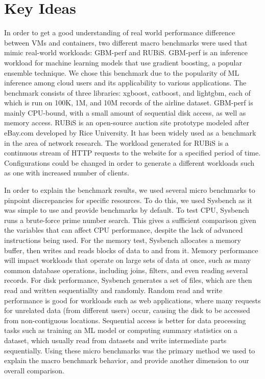 \documentclass[11pt]{article}
\begin{document}
\section{Key Ideas}

In order to get a good understanding of real world performance difference between VMs and containers, two different macro benchmarks were used that mimic real-world workloads: GBM-perf and RUBiS. GBM-perf is an inference workload for machine learning models that use gradient boosting, a popular ensemble technique. We chose this benchmark due to the popularity of ML inference among cloud users and its applicability to various applications. The benchmark consists of three libraries: xgboost, catboost, and lightgbm, each of which is run on 100K, 1M, and 10M records of the airline dataset. GBM-perf is mainly CPU-bound, with a small amount of sequential disk access, as well as memory access. RUBiS is an open-source auction site prototype modeled after eBay.com developed by Rice University. It has been widely used as a benchmark in the area of network research. The workload generated for RUBiS is a continuous stream of HTTP requests to the website for a specified period of time. Configurations could be changed in order to generate a different workloads such as one with increased number of clients. 

In order to explain the benchmark results, we used several micro benchmarks to pinpoint discrepancies for specific resources. To do this, we used Sysbench as it was simple to use and provide benchmarks by default. To test CPU, Sysbench runs a brute-force prime number search. This gives a sufficient comparison given the variables that can affect CPU performance, despite the lack of advanced instructions being used. For the memory test, Sysbench allocates a memory buffer, then writes and reads blocks of data to and from it. Memory performance will impact workloads that operate on large sets of data at once, such as many common database operations, including joins, filters, and even reading several records. For disk performance, Sysbench generates a set of files, which are then read and written sequentiallty and randomly. Random read and write performance is good for workloads such as web applications, where many requests for unrelated data (from different users) occur, causing the disk to be accessed from non-contiguous locations. Sequential access is better for data processing tasks such as training an ML model or computing summary statistics on a dataset, which usually read from datasets and write intermediate parts sequentially. Using these micro benchmarks was the primary method we used to explain the macro benchmark behavior, and provide another dimension to our overall comparison.
\end{document}
